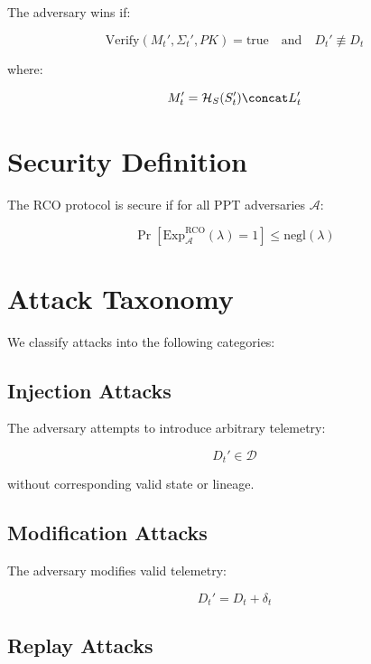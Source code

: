 The adversary wins if:

\begin{equation}
\text{Verify}(M_t', \Sigma_t', PK) = \text{true}
\quad \text{and} \quad
D_t' \not\equiv D_t
\end{equation}

where:

\begin{equation}
M_t' = \mathcal{H}_S(S_t') \concat L_t'
\end{equation}

\section{Security Definition}

The RCO protocol is secure if for all PPT adversaries $\mathcal{A}$:

\begin{equation}
\Pr[\text{Exp}_{\mathcal{A}}^{\text{RCO}}(\lambda) = 1] \leq \text{negl}(\lambda)
\end{equation}

\section{Attack Taxonomy}

We classify attacks into the following categories:

\subsection{Injection Attacks}

The adversary attempts to introduce arbitrary telemetry:

\begin{equation}
D_t' \in \mathcal{D}
\end{equation}

without corresponding valid state or lineage.

\subsection{Modification Attacks}

The adversary modifies valid telemetry:

\begin{equation}
D_t' = D_t + \delta_t
\end{equation}

\subsection{Replay Attacks}

